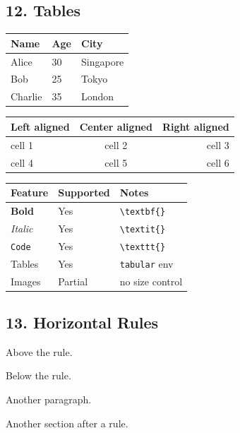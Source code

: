 \documentclass{article}
\begin{document}
\subsection{ 12. Tables}

\begin{tabular}{lll}
\hline
 Name     &  Age  &  City       \\
\hline
 Alice    &  30   &  Singapore  \\
 Bob      &  25   &  Tokyo      \\
 Charlie  &  35   &  London     \\
\hline
\end{tabular}

\begin{tabular}{lcr}
\hline
 Left aligned  &  Center aligned  &  Right aligned  \\
\hline
 cell 1        &  cell 2          &  cell 3         \\
 cell 4        &  cell 5          &  cell 6         \\
\hline
\end{tabular}

\begin{tabular}{lll}
\hline
 Feature       &  Supported  &  Notes               \\
\hline
 \textbf{Bold}      &  Yes        &  \texttt{\textbackslash{}textbf\{\}}         \\
 \emph{Italic}      &  Yes        &  \texttt{\textbackslash{}textit\{\}}         \\
 \texttt{Code}        &  Yes        &  \texttt{\textbackslash{}texttt\{\}}         \\
 Tables        &  Yes        &  \texttt{tabular} env       \\
 Images        &  Partial    &  no size control     \\
\hline
\end{tabular}

\subsection{ 13. Horizontal Rules}

Above the rule.

\noindent\hrulefill

Below the rule.

Another paragraph.

\noindent\hrulefill

Another section after a rule.
\end{document}
